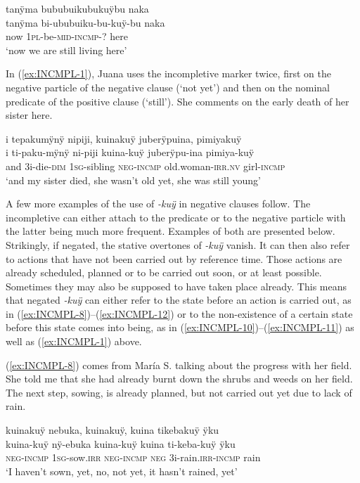 \ea\label{ex:INCMPL-7}
\begingl
\glpreamble tanÿma bububuikubukuÿbu naka\\
\gla tanÿma bi-ububuiku-bu-kuÿ-bu naka\\
\glb now 1\textsc{pl}-be-\textsc{mid}-\textsc{incmp}-? here\\
\glft ‘now we are still living here’
\endgl
\trailingcitation{[mqx-p110826l.093-094]}
\xe


In (\ref{ex:INCMPL-1}), Juana uses the incompletive marker twice, first on the negative particle of the negative clause (‘not yet’) and then on the nominal predicate of the positive clause (‘still’). She comments on the early death of her sister here.

\ea\label{ex:INCMPL-1}
\begingl 
\glpreamble i tepakumÿnÿ nipiji, kuinakuÿ juberÿpuina, pimiyakuÿ\\
\gla i ti-paku-mÿnÿ ni-piji kuina-kuÿ juberÿpu-ina pimiya-kuÿ\\ 
\glb and 3i-die-\textsc{dim} 1\textsc{sg}-sibling \textsc{neg}-\textsc{incmp} old.woman-\textsc{irr.nv} girl-\textsc{incmp}\\ 
\glft ‘and my sister died, she wasn’t old yet, she was still young’
\trailingcitation{[jxx-p120430l-2.346-347]}
\xe

A few more examples of the use of \textit{-kuÿ} in negative clauses follow. The incompletive can either attach to the predicate or to the negative particle with the latter being much more frequent. Examples of both are presented below. Strikingly, if negated, the stative overtones of \textit{-kuÿ} vanish. It can then also refer to actions that have not been carried out by reference time. Those actions are already scheduled, planned or to be carried out soon, or at least possible. Sometimes they may also be supposed to have taken place already. This means that negated \textit{-kuÿ} can either refer to the state before an action is carried out, as in (\ref{ex:INCMPL-8})–(\ref{ex:INCMPL-12}) or to the non-existence of a certain state before this state comes into being, as in (\ref{ex:INCMPL-10})–(\ref{ex:INCMPL-11}) as well as (\ref{ex:INCMPL-1}) above.

(\ref{ex:INCMPL-8}) comes from María S. talking about the progress with her field. She told me that she had already burnt down the shrubs and weeds on her field. The next step, sowing, is already planned, but not carried out yet due to lack of rain.

\ea\label{ex:INCMPL-8}
\begingl
\glpreamble kuinakuÿ nebuka, kuinakuÿ, kuina tikebakuÿ ÿku\\
\gla kuina-kuÿ nÿ-ebuka kuina-kuÿ kuina ti-keba-kuÿ ÿku\\
\glb \textsc{neg}-\textsc{incmp} 1\textsc{sg}-sow.\textsc{irr} \textsc{neg}-\textsc{incmp} \textsc{neg} 3i-rain.\textsc{irr}-\textsc{incmp} rain\\
\glft ‘I haven’t sown, yet, no, not yet, it hasn’t rained, yet’
\endgl
\trailingcitation{[rmx-e150922l.023]}
\xe

